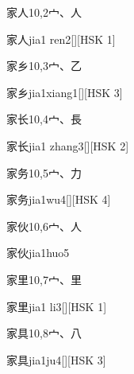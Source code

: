 \begin{entry}{家人}{10,2}{⼧、⼈}
  \begin{phonetics}{家人}{jia1 ren2}[][HSK 1]
  \end{phonetics}
\end{entry}

\begin{entry}{家乡}{10,3}{⼧、⼄}
  \begin{phonetics}{家乡}{jia1xiang1}[][HSK 3]
  \end{phonetics}
\end{entry}

\begin{entry}{家长}{10,4}{⼧、⾧}
  \begin{phonetics}{家长}{jia1 zhang3}[][HSK 2]
  \end{phonetics}
\end{entry}

\begin{entry}{家务}{10,5}{⼧、⼒}
  \begin{phonetics}{家务}{jia1wu4}[][HSK 4]
  \end{phonetics}
\end{entry}

\begin{entry}{家伙}{10,6}{⼧、⼈}
  \begin{phonetics}{家伙}{jia1huo5}
  \end{phonetics}
\end{entry}

\begin{entry}{家里}{10,7}{⼧、⾥}
  \begin{phonetics}{家里}{jia1 li3}[][HSK 1]
  \end{phonetics}
\end{entry}

\begin{entry}{家具}{10,8}{⼧、⼋}
  \begin{phonetics}{家具}{jia1ju4}[][HSK 3]
  \end{phonetics}
\end{entry}

